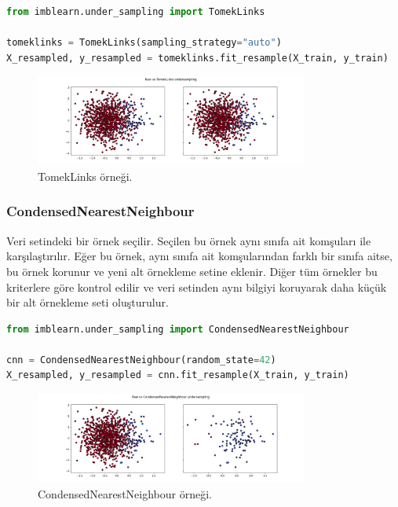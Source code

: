\begin{lstlisting}[language=Python]
from imblearn.under_sampling import TomekLinks

tomeklinks = TomekLinks(sampling_strategy="auto")
X_resampled, y_resampled = tomeklinks.fit_resample(X_train, y_train)
\end{lstlisting}

\begin{figure}[h]
    \centering
    \includegraphics[width=0.8\textwidth]{images/Raw vs TomekLinks undersampling.png}
    \caption{TomekLinks örneği.}
    \label{fig:enter-label}
\end{figure}

\subsubsection{CondensedNearestNeighbour}
Veri setindeki bir örnek seçilir. Seçilen bu örnek aynı sınıfa ait komşuları ile karşılaştırılır. Eğer bu örnek, aynı sınıfa ait komşularından farklı bir sınıfa aitse, bu örnek korunur ve yeni alt örnekleme setine eklenir. Diğer tüm örnekler bu kriterlere göre kontrol edilir ve veri setinden aynı bilgiyi koruyarak daha küçük bir alt örnekleme seti oluşturulur.

\begin{lstlisting}[language=Python]
from imblearn.under_sampling import CondensedNearestNeighbour

cnn = CondensedNearestNeighbour(random_state=42)
X_resampled, y_resampled = cnn.fit_resample(X_train, y_train)
\end{lstlisting}

\begin{figure}[h]
    \centering
    \includegraphics[width=0.8\textwidth]{images/Raw vs CondensedNearestNeighbour undersampling.png}
    \caption{CondensedNearestNeighbour örneği.}
    \label{fig:enter-label}
\end{figure}

